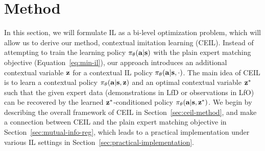 



\section{Method}

In this section, we will formulate IL as a bi-level optimization problem, which will allow us to derive our method, contextual imitation learning (CEIL). Instead of attempting to train the learning policy $\pi_\theta(\mathbf{a}|\mathbf{s})$ with the plain expert matching objective (Equation~\ref{eq:min-il}), our approach introduces an additional contextual variable ${\mathbf{z}}$ for a contextual IL policy $\pi_\theta(\mathbf{a}|\mathbf{s}, \cdot)$. 
The main idea of CEIL is to learn a contextual policy $\pi_\theta(\mathbf{a}|\mathbf{s}, {\mathbf{z}})$ and an optimal contextual variable ${\mathbf{z}}^*$ such that the given expert data (demonstrations in LfD or observations in LfO) can be recovered by the learned ${\mathbf{z}}^*$-conditioned policy $\pi_\theta(\mathbf{a}|\mathbf{s}, {\mathbf{z}}^*)$. 
We begin by describing the overall framework of CEIL in Section~\ref{sec:ceil-method}, and make a connection between CEIL and the plain expert matching objective in Section~\ref{sec:mutual-info-reg}, which leads to a practical implementation under various IL settings in Section~\ref{sec:practical-implementation}. 



